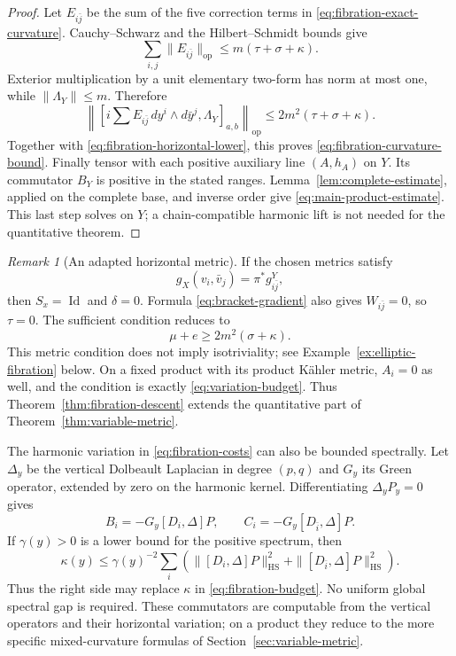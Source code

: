 \documentclass[11pt,reqno]{amsart}
\numberwithin{equation}{section}
\theoremstyle{definition}
\theoremstyle{remark}
\newtheorem{remark}[theorem]{Remark}
\newcommand{\Id}{\operatorname{Id}}
\begin{document}
\begin{proof}
Let $E_{i\bar j}$ be the sum of the five correction terms in \eqref{eq:fibration-exact-curvature}. Cauchy--Schwarz and the Hilbert--Schmidt bounds give
\[
 \sum_{i,j}\|E_{i\bar j}\|_{\mathrm{op}}
       \leq m(\tau+\sigma+\kappa).
\]
Exterior multiplication by a unit elementary two-form has norm at most one, while $\|\Lambda_Y\|\leq m$. Therefore
\[
 \left\|\left[i\sum E_{i\bar j}\,dy^i\wedge d\bar y^j,
                         \Lambda_Y\right]_{a,b}\right\|_{\mathrm{op}}
       \leq2m^2(\tau+\sigma+\kappa).
\]
Together with \eqref{eq:fibration-horizontal-lower}, this proves \eqref{eq:fibration-curvature-bound}. Finally tensor with each positive auxiliary line $(A,h_A)$ on $Y$. Its commutator $B_Y$ is positive in the stated ranges. Lemma~\ref{lem:complete-estimate}, applied on the complete base, and inverse order give \eqref{eq:main-product-estimate}. This last step solves on $Y$; a chain-compatible harmonic lift is not needed for the quantitative theorem.
\end{proof}

\begin{remark}[An adapted horizontal metric]\label{rem:adapted-horizontal}
If the chosen metrics satisfy
\begin{equation}\label{eq:adapted-horizontal}
 g_X(v_i,\bar v_j)=\pi^*g^Y_{i\bar j},
\end{equation}
then $S_x=\Id$ and $\delta=0$. Formula \eqref{eq:bracket-gradient} also gives $W_{i\bar j}=0$, so $\tau=0$. The sufficient condition reduces to
\[
 \mu+e\geq2m^2(\sigma+\kappa).
\]
This metric condition does not imply isotriviality; see Example~\ref{ex:elliptic-fibration} below. On a fixed product with its product K\"ahler metric, $A_i=0$ as well, and the condition is exactly \eqref{eq:variation-budget}. Thus Theorem~\ref{thm:fibration-descent} extends the quantitative part of Theorem~\ref{thm:variable-metric}.
\end{remark}

The harmonic variation in \eqref{eq:fibration-costs} can also be bounded spectrally. Let $\Delta_y$ be the vertical Dolbeault Laplacian in degree $(p,q)$ and $G_y$ its Green operator, extended by zero on the harmonic kernel. Differentiating $\Delta_yP_y=0$ gives
\begin{equation}\label{eq:fibration-green}
 B_i=-G_y[D_i,\Delta]P,
 \qquad C_i=-G_y[D_{\bar i},\Delta]P.
\end{equation}
If $\gamma(y)>0$ is a lower bound for the positive spectrum, then
\begin{equation}\label{eq:fibration-spectral-bound}
 \kappa(y)\leq\gamma(y)^{-2}\sum_i
 \left(\|[D_i,\Delta]P\|_{\mathrm{HS}}^2+
       \|[D_{\bar i},\Delta]P\|_{\mathrm{HS}}^2\right).
\end{equation}
Thus the right side may replace $\kappa$ in \eqref{eq:fibration-budget}. No uniform global spectral gap is required. These commutators are computable from the vertical operators and their horizontal variation; on a product they reduce to the more specific mixed-curvature formulas of Section~\ref{sec:variable-metric}.
\end{document}

